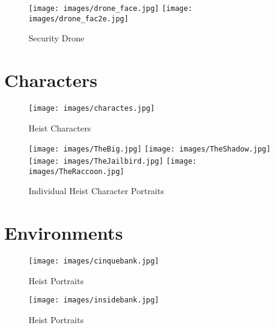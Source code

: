 \documentclass[10pt]{report}
\begin{document}
\begin{figure}[H]
    \centering
	\texttt{[image: images/drone\_face.jpg]}
	\texttt{[image: images/drone\_fac2e.jpg]}
    \caption{Security Drone}
\end{figure}

\section{Characters}

\begin{figure}[H]
    \centering
	\texttt{[image: images/charactes.jpg]}
    \caption{Heist Characters}
\end{figure}

\begin{figure}[H]
    \centering
	\texttt{[image: images/TheBig.jpg]}
	\texttt{[image: images/TheShadow.jpg]}
	\texttt{[image: images/TheJailbird.jpg]}
	\texttt{[image: images/TheRaccoon.jpg]}
    \caption{Individual Heist Character Portraits}
\end{figure}

\section{Environments}

\begin{figure}[H]
    \centering
	\texttt{[image: images/cinquebank.jpg]}
    \caption{Heist Portraits}
\end{figure}

\begin{figure}[H]
    \centering
	\texttt{[image: images/insidebank.jpg]}
    \caption{Heist Portraits}
\end{figure}
\end{document}
